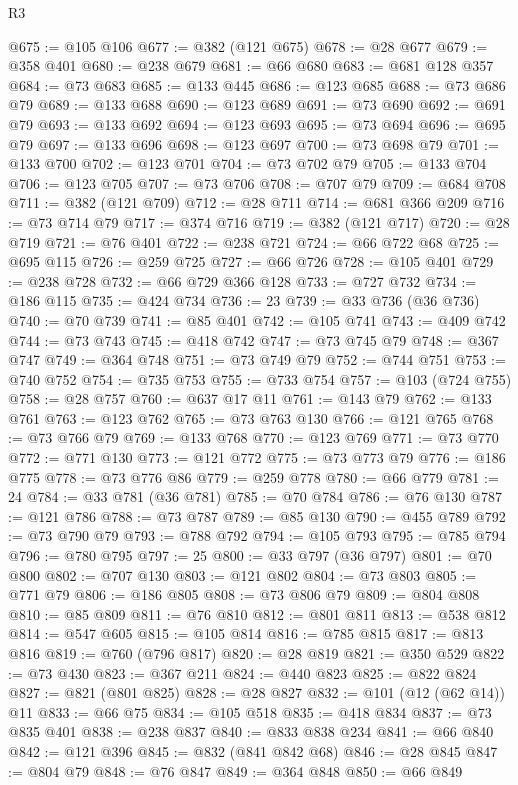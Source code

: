 \begin{lexlean}{R3}
\begin{coremodule}
@675 := @105 @106
@677 := @382 (@121 @675)
@678 := @28 @677
@679 := @358 @401
@680 := @238 @679
@681 := @66 @680
@683 := @681 @128 @357
@684 := @73 @683
@685 := @133 @445
@686 := @123 @685
@688 := @73 @686 @79
@689 := @133 @688
@690 := @123 @689
@691 := @73 @690
@692 := @691 @79
@693 := @133 @692
@694 := @123 @693
@695 := @73 @694
@696 := @695 @79
@697 := @133 @696
@698 := @123 @697
@700 := @73 @698 @79
@701 := @133 @700
@702 := @123 @701
@704 := @73 @702 @79
@705 := @133 @704
@706 := @123 @705
@707 := @73 @706
@708 := @707 @79
@709 := @684 @708
@711 := @382 (@121 @709)
@712 := @28 @711
@714 := @681 @366 @209
@716 := @73 @714 @79
@717 := @374 @716
@719 := @382 (@121 @717)
@720 := @28 @719
@721 := @76 @401
@722 := @238 @721
@724 := @66 @722 @68
@725 := @695 @115
@726 := @259 @725
@727 := @66 @726
@728 := @105 @401
@729 := @238 @728
@732 := @66 @729 @366 @128
@733 := @727 @732
@734 := @186 @115
@735 := @424 @734
@736 := 23
@739 := @33 @736 (@36 @736)
@740 := @70 @739
@741 := @85 @401
@742 := @105 @741
@743 := @409 @742
@744 := @73 @743
@745 := @418 @742
@747 := @73 @745 @79
@748 := @367 @747
@749 := @364 @748
@751 := @73 @749 @79
@752 := @744 @751
@753 := @740 @752
@754 := @735 @753
@755 := @733 @754
@757 := @103 (@724 @755)
@758 := @28 @757
@760 := @637 @17 @11
@761 := @143 @79
@762 := @133 @761
@763 := @123 @762
@765 := @73 @763 @130
@766 := @121 @765
@768 := @73 @766 @79
@769 := @133 @768
@770 := @123 @769
@771 := @73 @770
@772 := @771 @130
@773 := @121 @772
@775 := @73 @773 @79
@776 := @186 @775
@778 := @73 @776 @86
@779 := @259 @778
@780 := @66 @779
@781 := 24
@784 := @33 @781 (@36 @781)
@785 := @70 @784
@786 := @76 @130
@787 := @121 @786
@788 := @73 @787
@789 := @85 @130
@790 := @455 @789
@792 := @73 @790 @79
@793 := @788 @792
@794 := @105 @793
@795 := @785 @794
@796 := @780 @795
@797 := 25
@800 := @33 @797 (@36 @797)
@801 := @70 @800
@802 := @707 @130
@803 := @121 @802
@804 := @73 @803
@805 := @771 @79
@806 := @186 @805
@808 := @73 @806 @79
@809 := @804 @808
@810 := @85 @809
@811 := @76 @810
@812 := @801 @811
@813 := @538 @812
@814 := @547 @605
@815 := @105 @814
@816 := @785 @815
@817 := @813 @816
@819 := @760 (@796 @817)
@820 := @28 @819
@821 := @350 @529
@822 := @73 @430
@823 := @367 @211
@824 := @440 @823
@825 := @822 @824
@827 := @821 (@801 @825)
@828 := @28 @827
@832 := @101 (@12 (@62 @14)) @11
@833 := @66 @75
@834 := @105 @518
@835 := @418 @834
@837 := @73 @835 @401
@838 := @238 @837
@840 := @833 @838 @234
@841 := @66 @840
@842 := @121 @396
@845 := @832 (@841 @842 @68)
@846 := @28 @845
@847 := @804 @79
@848 := @76 @847
@849 := @364 @848
@850 := @66 @849

\end{coremodule}
\end{lexlean}

